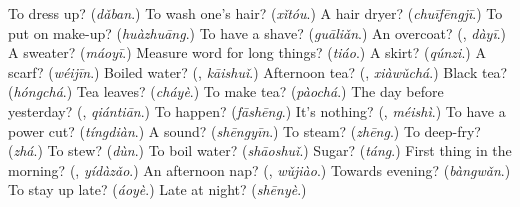\begin{tcolorbox}[breakable,colback=teal!4,colframe=teal!35!black,title={Before you move on}]
To dress up? (\emph{dǎban}.) To wash one's hair? (\emph{xǐtóu}.) A hair dryer? (\emph{chuīfēngjī}.) To put on make-up? (\emph{huàzhuāng}.) To have a shave? (\emph{guāliǎn}.) An overcoat? (\textbf{}, \emph{dàyī}.) A sweater? (\emph{máoyī}.) Measure word for long things? (\emph{tiáo}.) A skirt? (\emph{qúnzi}.) A scarf? (\emph{wéijīn}.) Boiled water? (\textbf{}, \emph{kāishuǐ}.) Afternoon tea? (\textbf{}, \emph{xiàwǔchá}.) Black tea? (\emph{hóngchá}.) Tea leaves? (\emph{cháyè}.) To make tea? (\emph{pàochá}.) The day before yesterday? (\textbf{}, \emph{qiántiān}.) To happen? (\emph{fāshēng}.) It's nothing? (\textbf{}, \emph{méishì}.) To have a power cut? (\emph{tíngdiàn}.) A sound? (\emph{shēngyīn}.) To steam? (\emph{zhēng}.) To deep-fry? (\emph{zhá}.) To stew? (\emph{dùn}.) To boil water? (\emph{shāoshuǐ}.) Sugar? (\emph{táng}.) First thing in the morning? (\textbf{}, \emph{yídàzǎo}.) An afternoon nap? (\textbf{}, \emph{wǔjiào}.) Towards evening? (\emph{bàngwǎn}.) To stay up late? (\emph{áoyè}.) Late at night? (\emph{shēnyè}.)
\end{tcolorbox}
